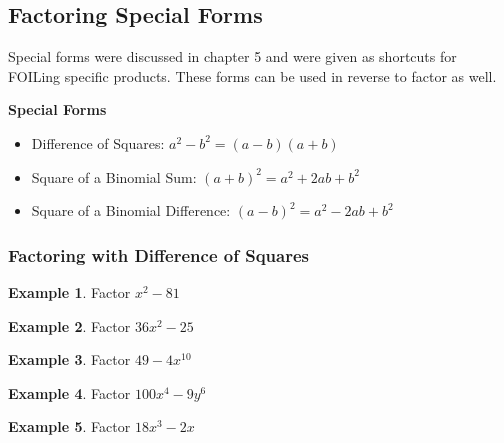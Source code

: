 \documentclass[addpoints,12pt]{exam}
\theoremstyle{definition}
\theoremstyle{break}
\theoremstyle{break}
\newtheorem{example}{Example}[subsection]
\begin{document}
\setcounter{section}{6}
\setcounter{subsection}{3}

\subsection{Factoring Special Forms}

\vspace{.15in}
Special forms were discussed in chapter 5 and were given as shortcuts for FOILing specific products. These forms can be used in reverse to factor as well.

\begin{mdframed}
\textbf{Special Forms}
\begin{itemize}
\item Difference of Squares: $a^2 - b^2 = (a-b)(a+b)$
\item Square of a Binomial Sum: $(a+b)^2 = a^2 + 2ab + b^2$
\item Square of a Binomial Difference: $(a-b)^2 = a^2 - 2ab + b^2$
\end{itemize}
\end{mdframed}
\vspace{.15in}

\subsubsection*{Factoring with Difference of Squares}

\begin{example}
Factor $x^2 - 81$
\vspace{1.15in}
\end{example}

\begin{example}
Factor $36x^2 - 25$
\vspace{1.15in}
\end{example}

\begin{example}
Factor $49 - 4x^{10}$
\end{example}

\newpage


\begin{example}
Factor $100x^4 - 9y^6$
\vspace{1in}
\end{example}

\begin{example}
Factor $18x^3 - 2x$
\vspace{1in}
\end{example}
\end{document}
